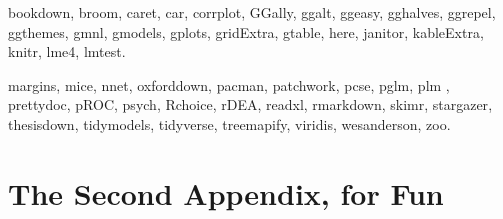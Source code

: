\documentclass[a4paper, nobind]{templates/ociamthesis}
\newcommand*{\bibtitle}{References}
\begin{document}
bookdown\autocite{bookdown},
broom\autocite{broom},
caret\autocite{caret},
car\autocite{car},
corrplot\autocite{corrplot2021},
GGally\autocite{ggally},
ggalt\autocite{ggalt},
ggeasy\autocite{ggeasy},
gghalves\autocite{gghalves},
ggrepel\autocite{ggrepel},
ggthemes\autocite{ggthemes},
gmnl\autocite{gmnl},
gmodels\autocite{gmodels},
gplots\autocite{gplots},
gridExtra\autocite{gridextra},
gtable\autocite{gtable},
here\autocite{here},
janitor\autocite{janitor},
kableExtra\autocite{kableExtra},
knitr\autocite{knitr},
lme4\autocite{lme4},
lmtest\autocite{lmtest}.

margins\autocite{margins},
mice\autocite{mice},
nnet\autocite{nnet},
oxforddown\autocite{lyngsOxforddown2019},
pacman\autocite{pacman},
patchwork\autocite{patchwork},
pcse\autocite{pcse},
pglm\autocite{pglm},
plm \autocite{plm},
prettydoc\autocite{prettydoc},
pROC\autocite{pROC},
psych\autocite{psych},
Rchoice\autocite{rchoice},
rDEA\autocite{rdea},
readxl\autocite{readxl},
rmarkdown\autocite{rmarkdown},
skimr\autocite{skimr},
stargazer\autocite{stargazer},
thesisdown\autocite{thesisdown2021},
tidymodels\autocite{tidymodels},
tidyverse\autocite{tidyverse},
treemapify\autocite{treemap},
viridis\autocite{viridis},
wesanderson\autocite{wesanderson},
zoo\autocite{zoo}.

\hypertarget{the-second-appendix-for-fun}{%
\chapter{The Second Appendix, for Fun}\label{the-second-appendix-for-fun}}




\setlength{\baselineskip}{0pt} %

{\renewcommand*\MakeUppercase[1]{#1}%
\printbibliography[heading=bibintoc,title={\bibtitle}]}
\end{document}
